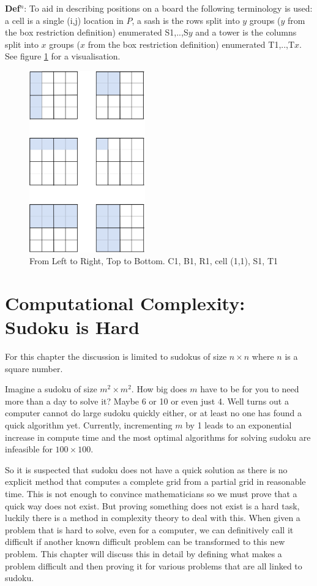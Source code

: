\documentclass[a4paper,11pt]{report}
\newcounter{row}
\newcounter{col}
\begin{document}
\textbf{Def$^n$}: To aid in describing positions on a board the following terminology is used: a cell is a single (i,j) location in $P$, a sash is the rows split into $y$ groups ($y$ from the box restriction definition) enumerated S1,..,S$y$ and a tower is the columns split into $x$ groups  ($x$ from the box restriction definition) enumerated T1,..,T$x$. See figure \ref{fig:labels} for a visualisation.

\begin{figure}[h!]
	\begin{center}
		\includegraphics[width=50mm]{figures/highlighted_cells.png}
	\end{center}
	\caption{\label{fig:labels}From Left to Right, Top to Bottom. C1, B1, R1, cell (1,1), S1, T1 }
\end{figure}

\chapter{Computational Complexity: Sudoku is Hard}

For this chapter the discussion is limited to sudokus of size $n \times n$ where $n$ is a square number.

Imagine a sudoku of size $m^2\times m^2$. How big does $m$ have to be for you to need more than a day to solve it? Maybe 6 or 10 or even just 4. Well turns out a computer cannot do large sudoku quickly either, or at least no one has found a quick algorithm yet. Currently, incrementing $m$ by 1 leads to an exponential increase in compute time and the most optimal algorithms for solving sudoku are infeasible for $100 \times 100$.

So it is suspected that sudoku does not have a quick solution as there is no explicit method that computes a complete grid from a partial grid in reasonable time. This is not enough to convince mathematicians so we must prove that a quick way does not exist. But proving something does not exist is a hard task, luckily there is a method in complexity theory to deal with this. When given a problem that is hard to solve, even for a computer, we can definitively call it difficult if another known difficult problem can be transformed to this new problem. This chapter will discuss this in detail by defining what makes a problem difficult and then proving it for various problems that are all linked to sudoku. 
\end{document}
